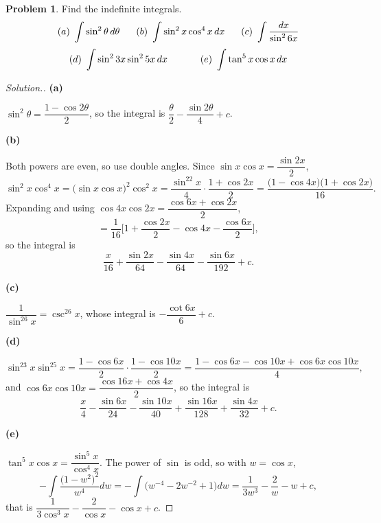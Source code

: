 \documentclass[11pt,a4paper]{article}
\theoremstyle{definition}
\newtheorem{problemx}{Problem}[subsection]
\newenvironment{problem}{\begin{problemx}}{\end{problemx}}
\newenvironment{solution}
  {\renewcommand{\qedsymbol}{}\begin{proof}[\textit{Solution}.]}
  {\end{proof}}
\newcommand{\subhead}[1]{%
  \par\medskip\noindent\textbf{#1}\par\nobreak\smallskip}
\begin{document}
\begin{problem}
Find the indefinite integrals.
$$(a)\ \int\sin^2\theta\,d\theta\hspace{0.6cm}(b)\ \int\sin^2x\cos^4x\,dx
\hspace{0.6cm}(c)\ \int\frac{dx}{\sin^26x}$$
$$(d)\ \int\sin^23x\sin^25x\,dx\hspace{1.2cm}(e)\ \int\tan^5x\cos x\,dx$$
\end{problem}
\begin{solution}
\subhead{(a)}
$\sin^2\theta = \dfrac{1-\cos 2\theta}{2}$, so the integral is
$\dfrac{\theta}{2} - \dfrac{\sin 2\theta}{4} + c$.

\subhead{(b)}
Both powers are even, so use double angles. Since
$\sin x\cos x = \dfrac{\sin 2x}{2}$,
$$\sin^2x\cos^4x = \big(\sin x\cos x\big)^2\cos^2x
= \frac{\sin^22x}{4}\cdot\frac{1+\cos 2x}{2}
= \frac{\big(1-\cos 4x\big)\big(1+\cos 2x\big)}{16}.$$
Expanding and using
$\cos 4x\cos 2x = \dfrac{\cos 6x + \cos 2x}{2}$,
$$= \frac{1}{16}\Big[1 + \frac{\cos 2x}{2} - \cos 4x - \frac{\cos 6x}{2}\Big],$$
so the integral is
$$\frac{x}{16} + \frac{\sin 2x}{64} - \frac{\sin 4x}{64}
- \frac{\sin 6x}{192} + c .$$

\subhead{(c)}
$\dfrac{1}{\sin^26x} = \csc^26x$, whose integral is
$-\dfrac{\cot 6x}{6} + c$.

\subhead{(d)}
$$\sin^23x\sin^25x = \frac{1-\cos 6x}{2}\cdot\frac{1-\cos 10x}{2}
= \frac{1 - \cos 6x - \cos 10x + \cos 6x\cos 10x}{4},$$
and $\cos 6x\cos 10x = \dfrac{\cos 16x + \cos 4x}{2}$, so the integral is
$$\frac{x}{4} - \frac{\sin 6x}{24} - \frac{\sin 10x}{40}
+ \frac{\sin 16x}{128} + \frac{\sin 4x}{32} + c .$$

\subhead{(e)}
$\tan^5x\cos x = \dfrac{\sin^5x}{\cos^4x}$. The power of $\sin$ is odd, so with
$w = \cos x$,
$$-\int\frac{\big(1-w^2\big)^2}{w^4}dw
= -\int\Big(w^{-4} - 2w^{-2} + 1\Big)dw
= \frac{1}{3w^3} - \frac{2}{w} - w + c ,$$
that is
$\dfrac{1}{3\cos^3x} - \dfrac{2}{\cos x} - \cos x + c$.
\end{solution}
\end{document}
